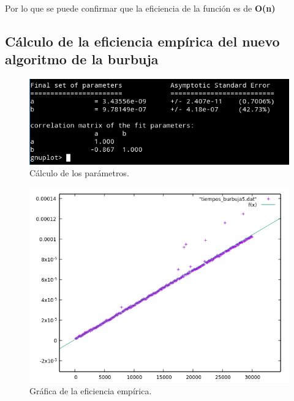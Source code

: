 Por lo que se puede confirmar que la eficiencia de la función es de \textbf{O(n)}

\newpage
\subsection{Cálculo de la eficiencia empírica del nuevo algoritmo de la burbuja}
\begin{figure}[H] %
\centering
\includegraphics[scale=0.7]{ejercicio5/datosBurbuja.png}  
\caption{Cálculo de los parámetros.} 
\label{fig:figura5-1}
\end{figure}

\begin{figure}[H] %
\centering
\includegraphics[scale=0.8]{ejercicio5/regresion.png}  
\caption{Gráfica de la eficiencia empírica.} 
\label{fig:figura5-2}
\end{figure}




\newpage

